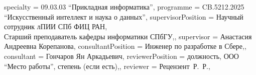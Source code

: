 {    specialty          = {09.03.03 \enquote{Прикладная информатика}},
    programme          = {CB.5212.2025 \enquote{Искусственный интеллект и наука о данных}},
    supervisorPosition = {Научный сотрудник лПИИ СПб ФИЦ РАН,\\ Старший преподаватель кафедры информатики СПбГУ,},
    supervisor         = {Анастасия Андреевна Корепанова},
    consultantPosition = {Инженер по разработке в Сбере,},
    consultant         = {Гончаров Ян Аркадьевич},
    reviewerPosition   = {должность, ООО \enquote{Место работы}, степень (если есть),},
    reviewer           = {Рецензент~Р.~Р.},
}

